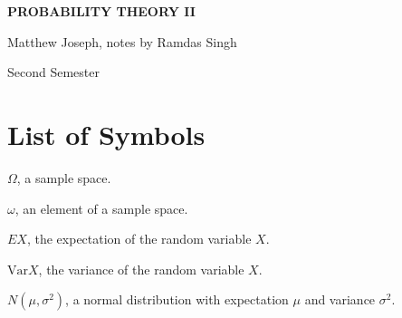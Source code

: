 \documentclass[15pt,a4paper]{book}
\theoremstyle{definition}
\begin{document}
\pagestyle{empty}

\begin{titlepage}
    \begin{center}
    \vspace*{\fill}
    {\Huge \textbf{\MakeUppercase{Probability Theory II}}\par}

    \vspace{0.5cm} %
    {\Large Matthew Joseph, notes by Ramdas Singh\par}

    \vspace{0.5cm} %
    {\large Second Semester\par}
    \vspace*{\fill}
    \end{center}
\end{titlepage}

\clearpage


\chapter*{List of Symbols}
\begin{notationlist}
    \item $\Omega$, a sample space.
    \item $\omega$, an element of a sample space.
    \item $EX$, the expectation of the random variable $X$.
    \item $\text{Var}X$, the variance of the random variable $X$.
    \item $N(\mu,\sigma^{2})$, a normal distribution with expectation $\mu$ and variance $\sigma^{2}$.
\end{notationlist}

\newpage
\setcounter{tocdepth}{2}
\tableofcontents

\newpage
{}
\pagestyle{fancy}




\chapter{}
\end{document}
